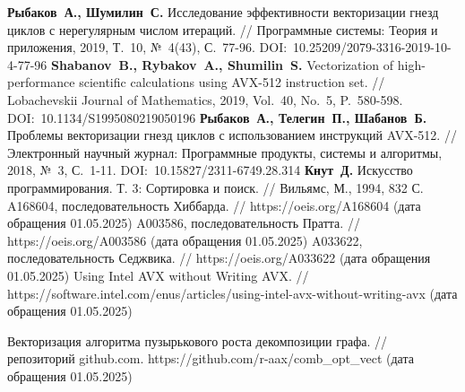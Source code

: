 \begin{thebibliography}{99}
%
\textbf{Рыбаков~А., Шумилин~С.} Исследование эффективности векторизации гнезд циклов с нерегулярным числом итераций. // Программные системы: Теория и приложения, 2019, Т.~10, №~4(43), С.~77-96. DOI:~10.25209/2079-3316-2019-10-4-77-96
%
\textbf{Shabanov~B., Rybakov~A., Shumilin~S.} Vectorization of high-performance scientific calculations using AVX-512 instruction set. // Lobachevskii Journal of Mathematics, 2019, Vol.~40, No.~5, P.~580-598. DOI:~10.1134/S1995080219050196
%
\textbf{Рыбаков~А., Телегин~П., Шабанов~Б.} Проблемы векторизации гнезд циклов с использованием инструкций AVX-512. // Электронный научный журнал: Программные продукты, системы и алгоритмы, 2018, №~3, С.~1-11. DOI:~10.15827/2311-6749.28.314
%
\textbf{Кнут~Д.} Искусство программирования. Т. 3: Сортировка и поиск. // Вильямс, М., 1994, 832 С.
%
A168604, последовательность Хиббарда. // https://oeis.org/A168604 (дата обращения 01.05.2025)
%
A003586, последовательность Пратта. // https://oeis.org/A003586 (дата обращения 01.05.2025)
%
A033622, последовательность Седжвика. // https://oeis.org/A033622 (дата обращения 01.05.2025)
%
Using Intel AVX without Writing AVX. // https://software.intel.com/enus/articles/using-intel-avx-without-writing-avx (дата обращения 01.05.2025)
%



%
Векторизация алгоритма пузырькового роста декомпозиции графа. // репозиторий github.com. https://github.com/r-aax/comb\_opt\_vect (дата обращения 01.05.2025)
%




\end{thebibliography}